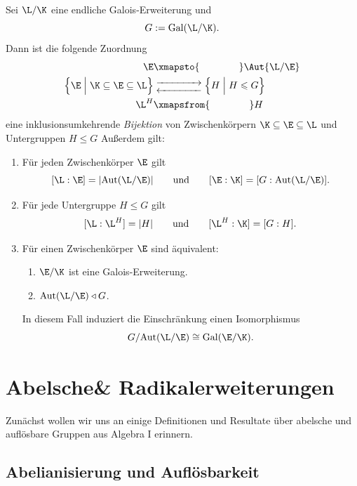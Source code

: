 \documentclass[11pt, a4paper]{article}
\begin{document}
\begin{theorem} \Theorem
    Sei $\L/\K$ eine endliche Galois-Erweiterung und
    $$G := \mathrm{Gal}(\L/\K).$$
    Dann ist die folgende Zuordnung
    \begin{align*}
    \E &\xmapsto{\qquad\qquad} \Aut{\L/\E} \\
    \left\{\E\;\Big| \; \K\subseteq \E\subseteq \L\right\}& \mathrel{\substack{\xrightarrow[]{\qquad\qquad} \\ \substack{\xleftarrow[]{\qquad\qquad}}}}\left\{H\;\Big|\; H\leqslant G\right\}\\
    \L^H & \xmapsfrom{\qquad \qquad} H
    \end{align*}
    eine inklusionsumkehrende \emph{Bijektion} von Zwischenkörpern $\K\subseteq \E\subseteq \L$ und Untergruppen $H\leqslant G$ Außerdem gilt:
    \begin{enumerate}[label=(\roman*)]
        \item Für jeden Zwischenkörper $\E$ gilt
        $$[\L:\E] = |\mathrm{Aut}(\L/\E)| \qquad \text{und} \qquad [\E:\K] = [G:\mathrm{Aut}(\L/\E)].$$
        \item Für jede Untergruppe $H \leqslant G$ gilt
        $$[\L:\L^H] = |H| \qquad \text{und} \qquad [\L^H:\K] = [G:H].$$
        \item Für einen Zwischenkörper $\E$ sind äquivalent:
        \begin{enumerate}[label=(\alph*)]
            \item $\E/\K$ ist eine Galois-Erweiterung.
            \item $\mathrm{Aut}(\L/\E) \triangleleft G$.
        \end{enumerate}
        In diesem Fall induziert die Einschränkung einen Isomorphismus
        $$G/\mathrm{Aut}(\L/\E) \cong \mathrm{Gal}(\E/\K).$$
    \end{enumerate}
\end{theorem}


\newpage
\section{Abelsche\hspace{6pt}\& Radikalerweiterungen}


Zunächst wollen wir uns an einige Definitionen und Resultate über abelsche und auflösbare Gruppen aus Algebra I erinnern.


\subsection{Abelianisierung und Auflösbarkeit}
\end{document}
